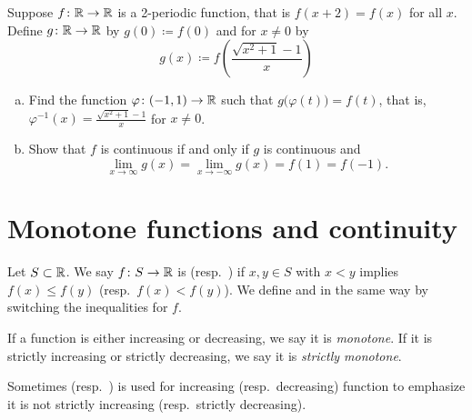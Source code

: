 \begin{exercise}
Suppose $f \colon {\mathbb{R}} \to {\mathbb{R}}$ is a 2-periodic function, that is $f(x + 2) =
f(x)$ for all $x$.  Define $g \colon {\mathbb{R}} \to {\mathbb{R}}$ by 
$g(0) \coloneqq f(0)$ and for $x \neq 0$ by
\begin{equation*}
g(x) \coloneqq f\left(\frac{\sqrt{x^2+1}-1}{x}\right)
\end{equation*}
\begin{enumerate}[a)]
\item
Find the function $\varphi \colon (-1,1) \to {\mathbb{R}}$ such that
$g\bigl(\varphi(t)\bigr) = f(t)$, that is, $\varphi^{-1}(x) = 
\frac{\sqrt{x^2+1}-1}{x}$ for $x \neq 0$.
\item
Show that $f$ is continuous if and only if $g$ is continuous and
\begin{equation*}
\lim_{x \to \infty} g(x) = 
\lim_{x \to -\infty} g(x) = 
f(1) = f(-1) .
\end{equation*}
\end{enumerate}
\end{exercise}


\sectionnewpage
\section{Monotone functions and continuity}
\label{sec:monotonefunc}



\begin{defn}
Let $S \subset {\mathbb{R}}$.
We say $f \colon S \to {\mathbb{R}}$ is \emph{}
(resp.\  \emph{}) if $x,y \in S$ with
$x < y$ implies $f(x) \leq f(y)$ (resp.\ $f(x) < f(y)$).
We define
\emph{} and
\emph{} in the same way by switching the
inequalities for $f$.

If a function is either increasing or decreasing, we say it is
\emph{monotone}.  If it is
strictly increasing or strictly decreasing, we say it is
\emph{strictly monotone}.
\end{defn}

Sometimes \emph{}
(resp.\ \emph{}) is used
for increasing (resp.\ decreasing) function to emphasize it is not
strictly increasing (resp.\ strictly decreasing).

